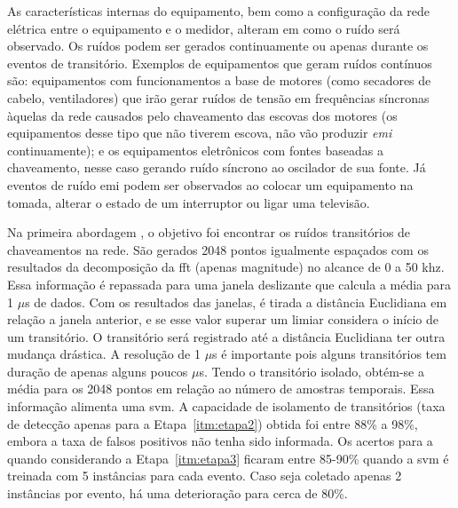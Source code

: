 \begin{enumerate}[label=\textbf{2.\arabic*},wide=\parindent]
\begin{itemize}[wide=\parindent]
As características internas do equipamento, bem como a configuração da
rede elétrica entre o equipamento e o medidor, alteram em como o ruído
será observado. Os ruídos podem ser gerados continuamente ou apenas
durante os eventos de transitório. Exemplos de equipamentos que geram
ruídos contínuos são: equipamentos com funcionamentos a base de motores
(como secadores de cabelo, ventiladores) que irão gerar ruídos de
tensão em frequências síncronas àquelas da rede causados pelo
chaveamento das escovas dos motores (os equipamentos desse tipo que não
tiverem escova, não vão produzir \emph{emi} continuamente); e os
equipamentos eletrônicos com fontes baseadas a chaveamento, nesse caso
gerando ruído síncrono ao oscilador de sua fonte. Já eventos de ruído
\gls{emi} podem ser observados ao colocar um equipamento na tomada,
alterar o estado de um interruptor ou ligar uma televisão.

Na primeira abordagem \cite{nilm_patel_2007_29}, o objetivo foi
encontrar os ruídos transitórios de chaveamentos na rede. São gerados
2048 pontos igualmente espaçados com os resultados da decomposição da
\gls{fft} (apenas magnitude) no alcance de 0 a 50 k\acs{hz}. Essa
informação é repassada para uma janela deslizante que calcula a média
para 1 $\mu$s de dados. Com os resultados das janelas, é tirada a
distância Euclidiana em relação a janela anterior, e se esse valor
superar um limiar considera o início de um transitório. O transitório
será registrado até a distância Euclidiana ter outra mudança drástica.
A resolução de 1 $\mu$s é importante pois alguns transitórios tem
duração de apenas alguns poucos $\mu$s. Tendo o transitório isolado,
obtém-se a média para os 2048 pontos em relação ao número de amostras
temporais. Essa informação alimenta uma \acs{svm}. A capacidade
de isolamento de transitórios (taxa de detecção apenas para a
Etapa~\ref{itm:etapa2}) obtida foi entre 88\% a 98\%, embora a taxa de
falsos positivos não tenha sido informada. Os acertos para a
quando considerando a Etapa~\ref{itm:etapa3} ficaram entre 85-90\%
quando a \acs{svm} é treinada com 5 instâncias para cada evento.
Caso seja coletado apenas 2 instâncias por evento, há uma deterioração
para cerca de 80\%.


\end{itemize}
\end{enumerate}

